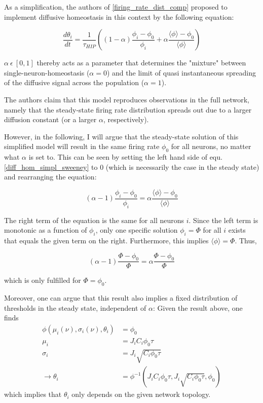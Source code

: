 \documentclass[10pt,a4paper]{article}
\begin{document}
As a simplification, the authors of \ref{firing_rate_dist_comp} proposed to implement diffusive homeostasis in this context by the following equation:

\begin{equation}
\frac{d\theta_i}{dt} = \frac{1}{\tau_{HIP}} \left(  (1-\alpha)\frac{\phi_i-\phi_0}{\phi_i} +\alpha \frac{\langle \phi \rangle-\phi_0}{\langle \phi \rangle} \right) 
\label{diff_hom_simpl_sweeney}
\end{equation}

$\alpha \: \epsilon \: [0,1]$ thereby acts as a parameter that determines the "mixture" between single-neuron-homeostasis ($\alpha=0$) and the limit of quasi instantaneous spreading of the diffusive signal across the population ($\alpha=1$).

The authors claim that this model reproduces observations in the full network, namely that the steady-state firing rate distribution spreads out due to a larger diffusion constant (or a larger $\alpha$, respectively).

However, in the following, I will argue that the steady-state solution of this simplified model will result in the same firing rate $\phi_0$ for all neurons, no matter what $\alpha$ is set to. This can be seen by setting the left hand side of equ. \eqref{diff_hom_simpl_sweeney} to $0$ (which is necessarily the case in the steady state) and rearranging the equation:

\begin{equation}
(\alpha-1)\frac{\phi_i - \phi_0}{\phi_i} = \alpha \frac{\langle \phi \rangle - \phi_0}{\langle \phi \rangle}
\label{diff_hom_simpl_sweeney_3}
\end{equation}

The right term of the equation is the same for all neurons $i$. Since the left term is monotonic as a function of $\phi_i$, only one specific solution $\phi_i = \Phi$ for all $i$ exists that equals the given term on the right. Furthermore, this implies $\langle \phi \rangle = \Phi$. Thus,

\begin{equation}
(\alpha-1)\frac{\Phi - \phi_0}{\Phi} = \alpha \frac{\Phi - \phi_0}{\Phi}
\label{diff_hom_simpl_sweeney_2}
\end{equation}

which is only fulfilled for $\Phi = \phi_0$.

Moreover, one can argue that this result also implies a fixed distribution of thresholds in the steady state, independent of $\alpha$: Given the result above, one finds
\begin{align}
\phi(\mu_i(\nu),\sigma_i(\nu),\theta_i) &= \phi_0 \label{fixed_thresh_dist_argument1} \\
\mu_i &= J_iC_i \phi_0 \tau \label{fixed_thresh_dist_argument2} \\
\sigma_i &= J_i\sqrt{C_i \phi_0  \tau} \label{fixed_thresh_dist_argument3} \\
\rightarrow \theta_i &= {\phi}^{-1}(J_iC_i \phi_0 \tau,J_i\sqrt{C_i \phi_0  \tau},\phi_0) \label{fixed_thresh_dist_argument4}
\end{align}
which implies that $\theta_i$ only depends on the given network topology.
\end{document}
